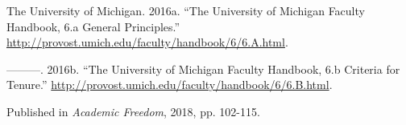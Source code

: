 \documentclass[
  10pt,
  letterpaper,
  DIV=11,
  numbers=noendperiod,
  twoside]{scrartcl}
\newlength{\cslhangindent}
\newenvironment{CSLReferences}[2] %
 {\begin{list}{}{%
  \setlength{\itemindent}{0pt}
  \setlength{\leftmargin}{0pt}
  \setlength{\parsep}{0pt}
  \ifodd #1
   \setlength{\leftmargin}{\cslhangindent}
   \setlength{\itemindent}{-1\cslhangindent}
  \fi
  \setlength{\itemsep}{#2\baselineskip}}}
 {\end{list}}
\begin{document}
\begin{CSLReferences}{1}{0}
The University of Michigan. 2016a. {``The University of Michigan Faculty
Handbook, 6.a General Principles.''}
\url{http://provost.umich.edu/faculty/handbook/6/6.A.html}.

---------. 2016b. {``The University of Michigan Faculty Handbook, 6.b
Criteria for Tenure.''}
\url{http://provost.umich.edu/faculty/handbook/6/6.B.html}.

\end{CSLReferences}



\noindent Published in\emph{
Academic Freedom}, 2018, pp. 102-115.
\end{document}

